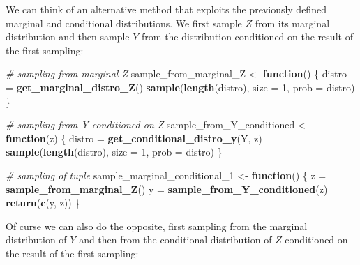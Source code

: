 \documentclass[
]{article}
\newenvironment{Shaded}{\begin{snugshade}}{\end{snugshade}}
\newcommand{\AttributeTok}[1]{\textcolor[rgb]{0.13,0.29,0.53}{#1}}
\newcommand{\CommentTok}[1]{\textcolor[rgb]{0.56,0.35,0.01}{\textit{#1}}}
\newcommand{\ControlFlowTok}[1]{\textcolor[rgb]{0.13,0.29,0.53}{\textbf{#1}}}
\newcommand{\DecValTok}[1]{\textcolor[rgb]{0.00,0.00,0.81}{#1}}
\newcommand{\FunctionTok}[1]{\textcolor[rgb]{0.13,0.29,0.53}{\textbf{#1}}}
\newcommand{\NormalTok}[1]{#1}
\newcommand{\OtherTok}[1]{\textcolor[rgb]{0.56,0.35,0.01}{#1}}
\begin{document}
We can think of an alternative method that exploits the previously
defined marginal and conditional distributions. We first sample \(Z\)
from its marginal distribution and then sample \(Y\) from the
distribution conditioned on the result of the first sampling:

\begin{Shaded}
\begin{Highlighting}[]
\CommentTok{\# sampling from marginal Z}
\NormalTok{sample\_from\_marginal\_Z }\OtherTok{\textless{}{-}} \ControlFlowTok{function}\NormalTok{() \{}
\NormalTok{    distro }\OtherTok{=} \FunctionTok{get\_marginal\_distro\_Z}\NormalTok{()}
    \FunctionTok{sample}\NormalTok{(}\FunctionTok{length}\NormalTok{(distro), }\AttributeTok{size =} \DecValTok{1}\NormalTok{, }\AttributeTok{prob =}\NormalTok{ distro)}
\NormalTok{\}}

\CommentTok{\# sampling from Y conditioned on Z}
\NormalTok{sample\_from\_Y\_conditioned }\OtherTok{\textless{}{-}} \ControlFlowTok{function}\NormalTok{(z) \{}
\NormalTok{    distro }\OtherTok{=} \FunctionTok{get\_conditional\_distro\_y}\NormalTok{(Y, z)}
    \FunctionTok{sample}\NormalTok{(}\FunctionTok{length}\NormalTok{(distro), }\AttributeTok{size =} \DecValTok{1}\NormalTok{, }\AttributeTok{prob =}\NormalTok{ distro)}
\NormalTok{\}}

\CommentTok{\# sampling of tuple}
\NormalTok{sample\_marginal\_conditional\_1 }\OtherTok{\textless{}{-}} \ControlFlowTok{function}\NormalTok{() \{}
\NormalTok{    z }\OtherTok{=} \FunctionTok{sample\_from\_marginal\_Z}\NormalTok{()}
\NormalTok{    y }\OtherTok{=} \FunctionTok{sample\_from\_Y\_conditioned}\NormalTok{(z)}
    \FunctionTok{return}\NormalTok{(}\FunctionTok{c}\NormalTok{(y, z))}
\NormalTok{\}}
\end{Highlighting}
\end{Shaded}

Of curse we can also do the opposite, first sampling from the marginal
distribution of \(Y\) and then from the conditional distribution of
\(Z\) conditioned on the result of the first sampling:
\end{document}
